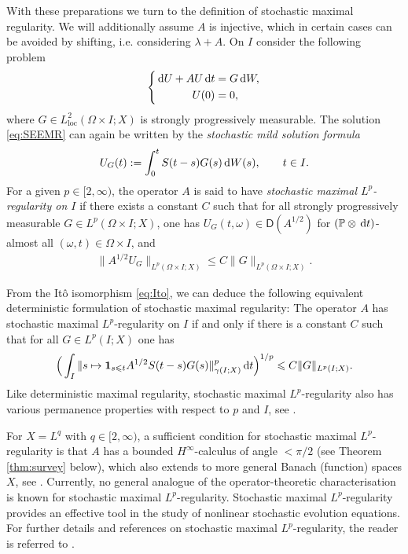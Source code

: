 \documentclass{amsart}
\let\leq\leqslant
\theoremstyle{plain}
\theoremstyle{remark}
\theoremstyle{plain}
\numberwithin{equation}{section}
\newcommand{\1}{\mathbf 1}
\newcommand{\dd}{\,{\rm d}}
\newcommand{\Dom}{\mathsf{D}}
\DeclareMathOperator{\loc}{loc}
\renewcommand{\P}{\mathbb{P}}
\begin{document}
With these preparations we turn to the definition of stochastic maximal regularity. We will additionally assume $A$ is injective, which in certain cases can be avoided by shifting, i.e. considering $\lambda+A$. On $I$ consider the following problem
\begin{equation}
\label{eq:SEEMR}
\left\{
\begin{aligned}
\dd U + A U \dd t &= G \dd W,\\
U(0)&=0,
\end{aligned}
\right.
\end{equation}
where $G\in L^2_{\loc}(\Omega\times I;X)$ is strongly progressively measurable.
The solution \eqref{eq:SEEMR} can again be written by the {\em stochastic  mild solution formula}
\[U_G(t) := \int_0^t S(t-s) G(s) \dd W(s),\qquad t \in I.\]
For a given $p\in [2, \infty)$, the operator $A$ is said to have {\em stochastic maximal $L^p$-regularity on $I$} if there exists a constant $C$ such that for all strongly progressively measurable $G\in L^p(\Omega\times I;X)$, one has $U_G(t,\omega)\in \Dom(A^{1/2})$ for $(\P\otimes\dd t)$-almost all $(\omega,t)\in\Omega\times I$, and
\begin{align}\label{eq:SMRest}
\|A^{1/2} U_G\|_{L^p(\Omega\times I;X)}\leq C \|G\|_{L^p(\Omega\times I;X)}.
\end{align}

From the It\^o isomorphism \eqref{eq:Ito}, we can deduce the following
equivalent deterministic formulation of stochastic maximal regularity: The operator $A$ has stochastic maximal $L^p$-regularity on $I$ if and only if there is a constant $C$ such that for all $G\in L^p(I;X)$ one has
\begin{align}\label{eq:SMRgamma}
\Big(\int_I \|s\mapsto \1_{s\leq t}A^{1/2} S(t-s) G(s)\|_{\gamma(I;X)}^p \dd t\Big)^{1/p} \leq C\|G\|_{L^p(I;X)}.
\end{align}
Like deterministic maximal regularity, stochastic maximal $L^p$-regularity also has various permanence properties with respect to $p$ and $I$, see \cite{AV19, LoVer}. 

For $X = L^q$ with $q\in [2, \infty)$, a sufficient condition for stochastic maximal $L^p$-regularity is that $A$ has a bounded $H^\infty$-calculus  of angle $<\pi/2$ (see Theorem \ref{thm:survey} below), which also extends to more general Banach (function) spaces $X$, see \cite{NVW-SMR, NVW-Rbounded}. Currently, no general analogue of the operator-theoretic characterisation is known for stochastic maximal $L^p$-regularity. Stochastic maximal $L^p$-regularity provides an effective tool in the study of nonlinear stochastic evolution equations. For further details and references on stochastic maximal $L^p$-regularity, the reader is referred to \cite{AVsurvey}.
\end{document}
